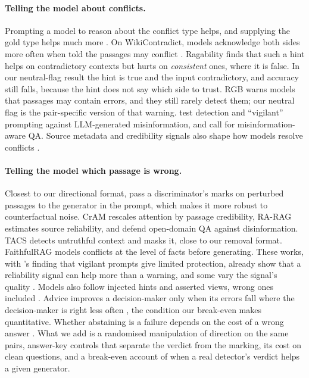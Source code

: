 \paragraph{Telling the model about conflicts.}
Prompting a model to reason about the conflict type helps, and supplying the gold type helps much more
\citep{cattan2025conflicts}. On WikiContradict, models acknowledge both sides more often when told the passages may
conflict \citep{hou2024wikicontradict}. Ragability \citep{gross2026ragability} finds that such a hint helps on
contradictory contexts but hurts on \emph{consistent} ones, where it is false. In our neutral-flag result the hint is
true and the input contradictory, and accuracy still falls, because the hint does not say which side to trust.
RGB \citep{chen2024rgb} warns models that passages may contain errors, and they still rarely
detect them; our neutral flag is the pair-specific version of that warning.
\citet{pan2023risk} test detection and ``vigilant'' prompting against LLM-generated misinformation, and
\citet{pan2023attacking} call for misinformation-aware QA. Source metadata and credibility signals also shape how models resolve conflicts
\citep{chiang2024metadata,ge2025confact}.

\paragraph{Telling the model which passage is wrong.}
Closest to our directional format, \citet{hong2024gullible} pass a discriminator's marks on perturbed passages to the
generator in the prompt, which makes it more robust to counterfactual noise. CrAM \citep{deng2025cram} rescales
attention by passage credibility, RA-RAG \citep{hwang2025rarag} estimates source reliability, and
\citet{weller2024defending} defend open-domain QA against disinformation. TACS \citep{yu2024tacs} detects untruthful context and masks it,
close to our removal format. FaithfulRAG \citep{zhang2025faithfulrag} models
conflicts at the level of facts before generating. These works, with \citet{pan2023risk}'s finding that vigilant
prompts give limited protection, already show that a reliability signal can help more than a warning, and some vary
the signal's quality \citep{hong2024gullible,pan2024credibility}. Models also follow injected hints and asserted views, wrong
ones included \citep{turpin2023unfaithful,sharma2024sycophancy}. Advice improves a decision-maker only when its
errors fall where the decision-maker is right less often \citep{bansal2021accurate,mozannar2020defer}, the
condition our break-even makes quantitative. Whether
abstaining is a failure depends on the cost of a wrong answer \citep{wen2025abstention,song2025trustscore}.
What we add is a randomised manipulation of direction on the same pairs, answer-key controls that separate the verdict
from the marking, its cost on clean questions, and a break-even account of when a real detector's verdict helps a
given generator.

